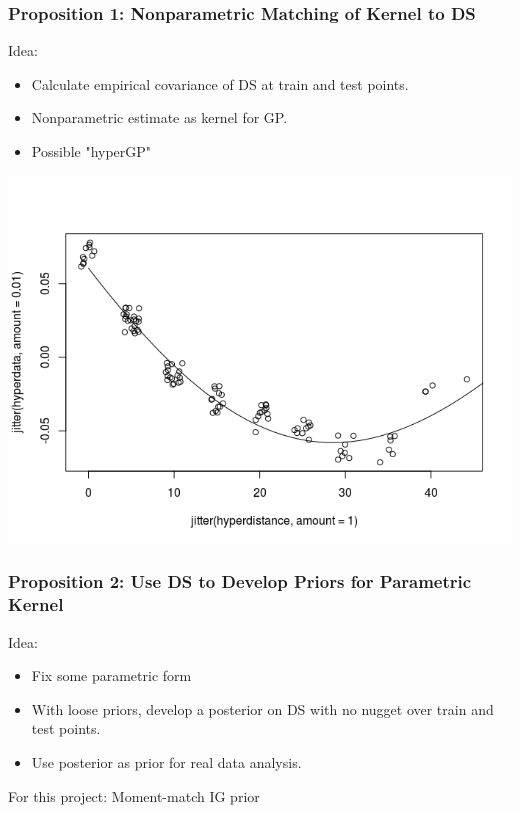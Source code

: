 \documentclass{beamer}
\begin{document}
	\begin{frame}
		\frametitle{Proposition 1: Nonparametric Matching of Kernel to DS}
		
		Idea: 
		
		\begin{itemize}
			\item Calculate empirical covariance of DS at train and test points.
			\item Nonparametric estimate as kernel for GP.
			\item Possible "hyperGP"
		\end{itemize}
		
		\includegraphics[scale=0.5]{PrezImage6.png}
		
	\end{frame}
	
	\begin{frame}
		\frametitle{Proposition 2: Use DS to Develop Priors for Parametric Kernel}
		
		Idea: 
		
		\begin{itemize}
			\item Fix some parametric form
			\item With loose priors, develop a posterior on DS with no nugget over train and test points.
			\item Use posterior as prior for real data analysis.
		\end{itemize}
		
		\vspace{1em}
		
		For this project: Moment-match IG prior
		
	\end{frame}
	
\end{document}
